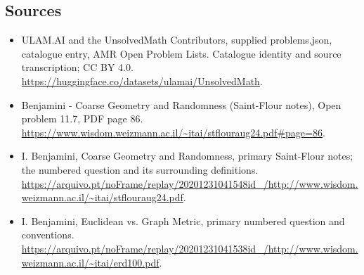 \documentclass[11pt,a4paper]{article}
\begin{document}
\subsection{Sources}
\begin{itemize}
\item[S1] ULAM.AI and the UnsolvedMath Contributors, supplied problems.json, catalogue entry, AMR Open Problem Lists. Catalogue identity and source transcription; CC BY 4.0.
\url{https://huggingface.co/datasets/ulamai/UnsolvedMath}.
\item[S2] Benjamini - Coarse Geometry and Randomness (Saint-Flour notes), Open problem 11.7, PDF page 86. 
\url{https://www.wisdom.weizmann.ac.il/~itai/stflouraug24.pdf#page=86}.
\item[S3] I. Benjamini, Coarse Geometry and Randomness, primary Saint-Flour notes; the numbered question and its surrounding definitions.
\url{https://arquivo.pt/noFrame/replay/20201231041548id_/http://www.wisdom.weizmann.ac.il/~itai/stflouraug24.pdf}.
\item[S4] I. Benjamini, Euclidean vs. Graph Metric, primary numbered question and conventions.
\url{https://arquivo.pt/noFrame/replay/20201231041538id_/http://www.wisdom.weizmann.ac.il/~itai/erd100.pdf}.
\end{itemize}
\end{document}
